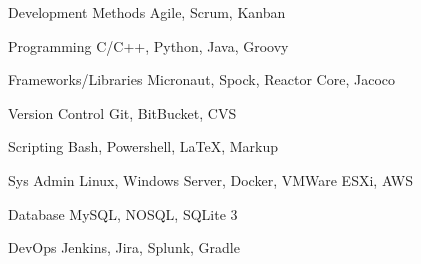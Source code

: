 
\begin{cvskills}

  \cvskill
    {Development Methods}
    {Agile, Scrum, Kanban}

  \cvskill
    {Programming}
    {C/C++, Python, Java, Groovy}

  \cvskill
    {Frameworks/Libraries}
    {Micronaut, Spock, Reactor Core, Jacoco}

  \cvskill
    {Version Control}
    {Git, BitBucket, CVS}
    
  \cvskill
    {Scripting}
    {Bash, Powershell, LaTeX, Markup}

  \cvskill
    {Sys Admin}
    {Linux, Windows Server, Docker, VMWare ESXi, AWS}
    
  \cvskill
    {Database}
    {MySQL, NOSQL, SQLite 3}
    
  \cvskill
    {DevOps}
    {Jenkins, Jira, Splunk, Gradle}
    
\end{cvskills}
